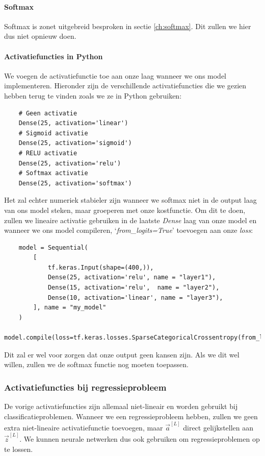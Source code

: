\paragraph{Softmax}

Softmax is zonet uitgebreid besproken in sectie \ref{ch:softmax}. Dit zullen we hier dus niet opnieuw doen.

\paragraph{Activatiefuncties in Python}
We voegen de activatiefunctie toe aan onze laag wanneer we ons model implementeren. Hieronder zijn de verschillende activatiefuncties die we gezien hebben terug te vinden zoals we ze in Python gebruiken:

\begin{lstlisting}
	# Geen activatie
	Dense(25, activation='linear')
	# Sigmoid activatie
	Dense(25, activation='sigmoid')
	# RELU activatie
	Dense(25, activation='relu')
	# Softmax activatie
	Dense(25, activation='softmax')
\end{lstlisting}
\noindent
Het zal echter numeriek stabieler zijn wanneer we softmax niet in de output laag van ons model steken, maar groeperen met onze kostfunctie. Om dit te doen, zullen we lineaire activatie gebruiken in de laatste \textit{Dense} laag van onze model en wanneer we ons model compileren, `\textit{from\_logits=True}' toevoegen aan onze \textit{loss}:
\begin{lstlisting}
	model = Sequential(
	    [
	        tf.keras.Input(shape=(400,)),     
	        Dense(25, activation='relu', name = "layer1"),
	        Dense(15, activation='relu',  name = "layer2"),   
	        Dense(10, activation='linear', name = "layer3"),  
	    ], name = "my_model"
	)
	model.compile(loss=tf.keras.losses.SparseCategoricalCrossentropy(from_logits=True))
\end{lstlisting}
\noindent
Dit zal er wel voor zorgen dat onze output geen kansen zijn. Als we dit wel willen, zullen we de softmax functie nog moeten toepassen.

\subsubsection{Activatiefuncties bij regressieprobleem}

De vorige activatiefuncties zijn allemaal niet-lineair en worden gebruikt bij classificatieproblemen. Wanneer we een regressieprobleem hebben, zullen we geen extra niet-lineaire activatiefunctie toevoegen, maar $\vec{a}^{[L]}$ direct gelijkstellen aan $\vec{z}^{[L]}$. We kunnen neurale netwerken dus ook gebruiken om regressieproblemen op te lossen. 

